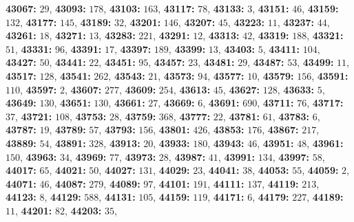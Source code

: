 \textsf{\bfseries 43067:} $29$, \textsf{\bfseries 43093:} $178$, \textsf{\bfseries 43103:} $163$, \textsf{\bfseries 43117:} $78$, \textsf{\bfseries 43133:} $3$, \textsf{\bfseries 43151:} $46$, \textsf{\bfseries 43159:} $132$, \textsf{\bfseries 43177:} $145$, \textsf{\bfseries 43189:} $32$, \textsf{\bfseries 43201:} $146$, \textsf{\bfseries 43207:} $45$, \textsf{\bfseries 43223:} $11$, \textsf{\bfseries 43237:} $44$, \textsf{\bfseries 43261:} $18$, \textsf{\bfseries 43271:} $13$, \textsf{\bfseries 43283:} $221$, \textsf{\bfseries 43291:} $12$, \textsf{\bfseries 43313:} $42$, \textsf{\bfseries 43319:} $188$, \textsf{\bfseries 43321:} $51$, \textsf{\bfseries 43331:} $96$, \textsf{\bfseries 43391:} $17$, \textsf{\bfseries 43397:} $189$, \textsf{\bfseries 43399:} $13$, \textsf{\bfseries 43403:} $5$, \textsf{\bfseries 43411:} $104$, \textsf{\bfseries 43427:} $50$, \textsf{\bfseries 43441:} $22$, \textsf{\bfseries 43451:} $95$, \textsf{\bfseries 43457:} $23$, \textsf{\bfseries 43481:} $29$, \textsf{\bfseries 43487:} $53$, \textsf{\bfseries 43499:} $11$, \textsf{\bfseries 43517:} $128$, \textsf{\bfseries 43541:} $262$, \textsf{\bfseries 43543:} $21$, \textsf{\bfseries 43573:} $94$, \textsf{\bfseries 43577:} $10$, \textsf{\bfseries 43579:} $156$, \textsf{\bfseries 43591:} $110$, \textsf{\bfseries 43597:} $2$, \textsf{\bfseries 43607:} $277$, \textsf{\bfseries 43609:} $254$, \textsf{\bfseries 43613:} $45$, \textsf{\bfseries 43627:} $128$, \textsf{\bfseries 43633:} $5$, \textsf{\bfseries 43649:} $130$, \textsf{\bfseries 43651:} $130$, \textsf{\bfseries 43661:} $27$, \textsf{\bfseries 43669:} $6$, \textsf{\bfseries 43691:} $690$, \textsf{\bfseries 43711:} $76$, \textsf{\bfseries 43717:} $37$, \textsf{\bfseries 43721:} $108$, \textsf{\bfseries 43753:} $28$, \textsf{\bfseries 43759:} $368$, \textsf{\bfseries 43777:} $22$, \textsf{\bfseries 43781:} $61$, \textsf{\bfseries 43783:} $6$, \textsf{\bfseries 43787:} $19$, \textsf{\bfseries 43789:} $57$, \textsf{\bfseries 43793:} $156$, \textsf{\bfseries 43801:} $426$, \textsf{\bfseries 43853:} $176$, \textsf{\bfseries 43867:} $217$, \textsf{\bfseries 43889:} $54$, \textsf{\bfseries 43891:} $328$, \textsf{\bfseries 43913:} $20$, \textsf{\bfseries 43933:} $180$, \textsf{\bfseries 43943:} $46$, \textsf{\bfseries 43951:} $48$, \textsf{\bfseries 43961:} $150$, \textsf{\bfseries 43963:} $34$, \textsf{\bfseries 43969:} $77$, \textsf{\bfseries 43973:} $28$, \textsf{\bfseries 43987:} $41$, \textsf{\bfseries 43991:} $134$, \textsf{\bfseries 43997:} $58$, \textsf{\bfseries 44017:} $65$, \textsf{\bfseries 44021:} $50$, \textsf{\bfseries 44027:} $131$, \textsf{\bfseries 44029:} $23$, \textsf{\bfseries 44041:} $38$, \textsf{\bfseries 44053:} $55$, \textsf{\bfseries 44059:} $2$, \textsf{\bfseries 44071:} $46$, \textsf{\bfseries 44087:} $279$, \textsf{\bfseries 44089:} $97$, \textsf{\bfseries 44101:} $191$, \textsf{\bfseries 44111:} $137$, \textsf{\bfseries 44119:} $213$, \textsf{\bfseries 44123:} $8$, \textsf{\bfseries 44129:} $588$, \textsf{\bfseries 44131:} $105$, \textsf{\bfseries 44159:} $119$, \textsf{\bfseries 44171:} $6$, \textsf{\bfseries 44179:} $227$, \textsf{\bfseries 44189:} $11$, \textsf{\bfseries 44201:} $82$, \textsf{\bfseries 44203:} $35$, 
